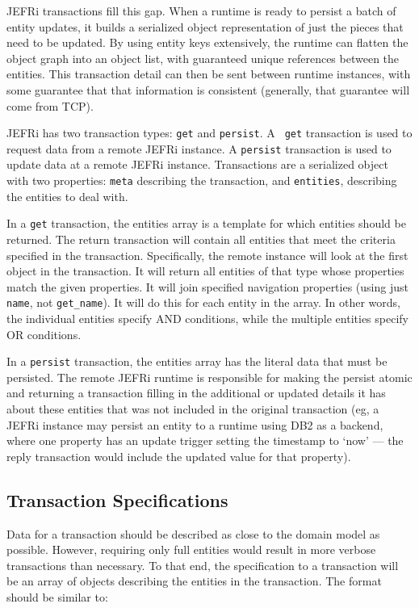 \documentclass{article}
\newcommand{\ilcode}{\tt}
\begin{document}
JEFRi transactions fill this gap. When a runtime is ready to persist a batch
of entity updates, it builds a serialized object representation of just the
pieces that need to be updated. By using entity keys extensively, the runtime
can flatten the object graph into an object list, with guaranteed unique
references between the entities. This transaction detail can then be sent
between runtime instances, with some guarantee that that information is
consistent (generally, that guarantee will come from TCP).

JEFRi has two transaction types: {\ilcode get} and {\ilcode persist}. A {\ilcode
get} transaction is used to request data from a remote JEFRi instance. A
{\ilcode persist} transaction is used to update data at a remote JEFRi instance.
Transactions are a serialized object with two properties: {\ilcode meta}
describing the transaction, and {\ilcode entities}, describing the entities to
deal with.

In a {\ilcode get} transaction, the entities array is a template for which
entities should be returned. The return transaction will contain all entities
that meet the criteria specified in the transaction. Specifically, the remote
instance will look at the first object in the transaction. It will return all
entities of that type whose
properties match the given properties. It will join specified navigation
properties (using just {\ilcode name}, not {\ilcode get\_name}). It will do this
for each entity in the array. In other words, the individual entities specify
AND conditions, while the multiple entities specify OR conditions.

In a {\ilcode persist} transaction, the entities array has the literal data that must be
persisted. The remote JEFRi runtime is responsible for making the persist atomic
and returning a transaction filling in the additional or updated details it has
about these entities that was not included in the original transaction (eg, a
JEFRi instance may persist an entity to a runtime using DB2 as a backend, where
one property has an update trigger setting the timestamp to `now' --- the reply
transaction would include the updated value for that property).

\subsection{Transaction Specifications}

Data for a transaction should be described as close to the domain model as
possible. However, requiring only full entities would result in more verbose
transactions than necessary. To that end, the specification to a transaction
will be an array of objects describing the entities in the transaction. The
format should be similar to:
\end{document}
